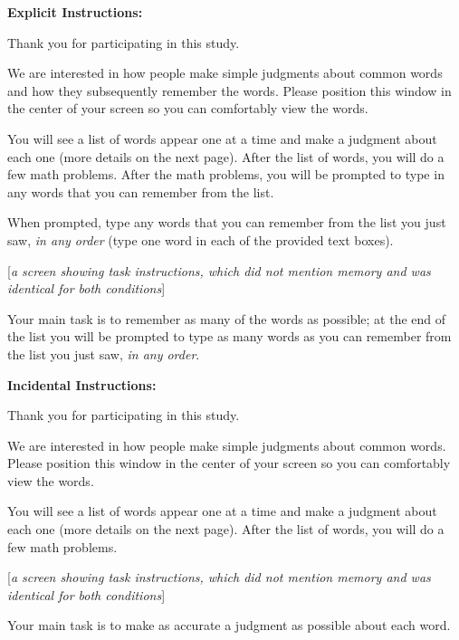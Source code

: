 \documentclass[man,natbib,floatsintext]{apa6} %
\begin{document}
\textbf{Explicit Instructions:}

\begin{displayquote}
        Thank you for participating in this study. 

        We are interested in how people make simple judgments about common words and
        how they subsequently remember the words. Please position this window in the center
        of your screen so you can comfortably view the words.

        You will see a list of words appear one at a time and make a judgment about each one
        (more details on the next page). After the list of words, you will do a few math problems.
        After the math problems, you will be prompted to type in any words that you can remember
        from the list.

        When prompted, type any words that you can remember from the list you just saw,
        \emph{in any order} (type one word in each of the provided text boxes).

    [\textit{a screen showing task instructions, which did not mention memory and was identical for both conditions}]

        Your main task is to remember as many of the words as possible; at the end of the list you will be prompted to
    type as many words as you can remember from the list you just saw, \emph{in any order}.
\end{displayquote}


\textbf{Incidental Instructions:}

\begin{displayquote}
        Thank you for participating in this study.

        We are interested in how people make simple judgments about common words.
        Please position this window in the center of your screen so you can comfortably view the words.

        You will see a list of words appear one at a time and make a judgment about each one
        (more details on the next page). After the list of words, you will do a few math problems.
        
        [\textit{a screen showing task instructions, which did not mention memory and was identical for both conditions}]

        Your main task is to make as accurate a judgment as possible about each word.
\end{displayquote}
\end{document}
